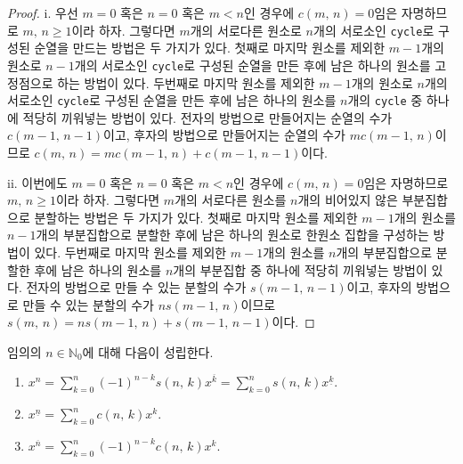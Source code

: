 \begin{proof}
    i. 우선 $m=0$ 혹은 $n=0$ 혹은 $m<n$인 경우에 $c(m,\,n)=0$임은 자명하므로 $m,\,n\geq1$이라 하자. 그렇다면 $m$개의 서로다른 원소로 $n$개의 서로소인 \texttt{cycle}로 구성된 순열을 만드는 방법은 두 가지가 있다. 첫째로 마지막 원소를 제외한 $m-1$개의 원소로 $n-1$개의 서로소인 \texttt{cycle}로 구성된 순열을 만든 후에 남은 하나의 원소를 고정점으로 하는 방법이 있다. 두번째로 마지막 원소를 제외한 $m-1$개의 원소로 $n$개의 서로소인 \texttt{cycle}로 구성된 순열을 만든 후에 남은 하나의 원소를 $n$개의 \texttt{cycle} 중 하나에 적당히 끼워넣는 방법이 있다. 전자의 방법으로 만들어지는 순열의 수가 $c(m-1,\,n-1)$이고, 후자의 방법으로 만들어지는 순열의 수가 $mc(m-1,\,n)$이므로 $c(m,\,n)=mc(m-1,\,n)+c(m-1,\,n-1)$이다.

    ii. 이번에도 $m=0$ 혹은 $n=0$ 혹은 $m<n$인 경우에 $c(m,\,n)=0$임은 자명하므로 $m,\,n\geq1$이라 하자. 그렇다면 $m$개의 서로다른 원소를 $n$개의 비어있지 않은 부분집합으로 분할하는 방법은 두 가지가 있다. 첫째로 마지막 원소를 제외한 $m-1$개의 원소를 $n-1$개의 부분집합으로 분할한 후에 남은 하나의 원소로 한원소 집합을 구성하는 방법이 있다. 두번째로 마지막 원소를 제외한 $m-1$개의 원소를 $n$개의 부분집합으로 분할한 후에 남은 하나의 원소를 $n$개의 부분집합 중 하나에 적당히 끼워넣는 방법이 있다. 전자의 방법으로 만들 수 있는 분할의 수가 $s(m-1,\,n-1)$이고, 후자의 방법으로 만들 수 있는 분할의 수가 $ns(m-1,\,n)$이므로 $s(m,\,n)=ns(m-1,\,n)+s(m-1,\,n-1)$이다.
\end{proof}

\begin{theorem}
    임의의 $n\in\mathbb{N}_0$에 대해 다음이 성립한다.
    \begin{enumerate}
        \item $x^n=\sum_{k=0}^n(-1)^{n-k}s(n,\,k)x^{\overline{k}}=\sum_{k=0}^ns(n,\,k)x^{\underline{k}}$.
        \item $x^{\underline{n}}=\sum_{k=0}^nc(n,\,k)x^k$.
        \item $x^{\overline{n}}=\sum_{k=0}^n(-1)^{n-k}c(n,\,k)x^k$.
    \end{enumerate}
\end{theorem}


